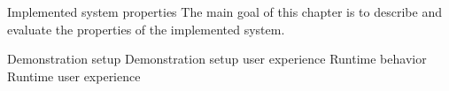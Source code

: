 \chap Implemented system properties
The main goal of this chapter is to describe and evaluate the properties of the implemented system.

\sec Demonstration setup
\sec Demonstration setup user experience
\sec Runtime behavior
\sec Runtime user experience
